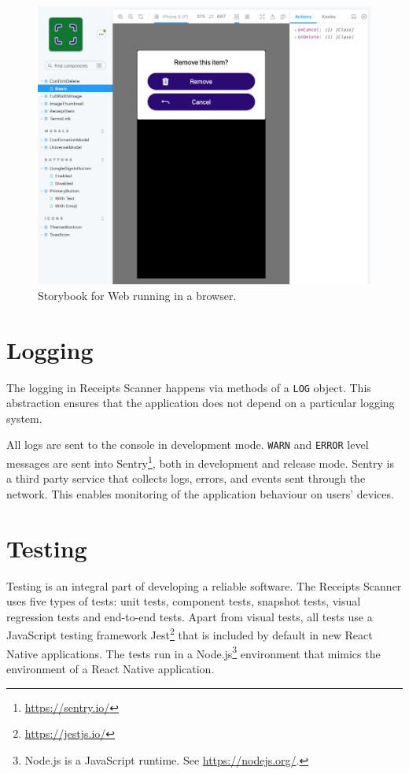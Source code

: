 \documentclass[
  digital, %
  table,   %
  oneside, %
  lof,     %
  lot,     %
]{fithesis3}
\begin{document}
\begin{figure}[H]
    \begin{center}
        \includegraphics[width=\textwidth]{figures/other/storybook_web}
    \end{center}
    \caption{Storybook for Web running in a browser.}
    \label{fig:storybook_web}
\end{figure}

\section{Logging}
The logging in Receipts Scanner happens via methods of a \texttt{LOG} object. This abstraction ensures that the application does not depend on a particular logging system.

All logs are sent to the console in development mode. \texttt{WARN} and \texttt{ERROR} level messages are sent into Sentry\footnote{\url{https://sentry.io/}}, both in development and release mode. Sentry is a third party service that collects logs, errors, and events sent through the network. This enables monitoring of the application behaviour on users' devices.

\section{Testing}
Testing is an integral part of developing a reliable software.
The Receipts Scanner uses five types of tests: unit tests, component tests, snapshot tests, visual regression tests and end-to-end tests.
Apart from visual tests, all tests use a JavaScript testing framework Jest\footnote{\url{https://jestjs.io/}} that is included by default in new React Native applications. The tests run in a Node.js\footnote{Node.js is a JavaScript runtime. See \url{https://nodejs.org/}.} environment that mimics the environment of a React Native application. 
\end{document}
